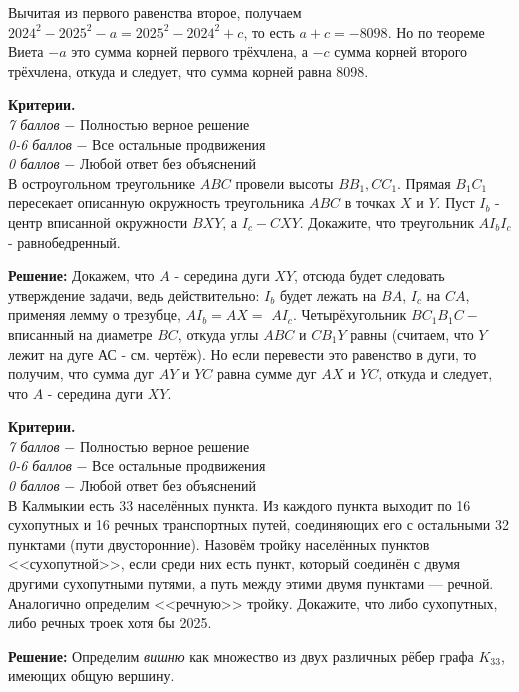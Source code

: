 Вычитая из первого равенства второе, получаем $2024^2-2025^2-a=2025^2-2024^2+c$, то есть $a+c=-8098$. Но по теореме Виета $-a$ это сумма корней первого трёхчлена, а $-c$ сумма корней второго трёхчлена, откуда и следует, что сумма корней равна 8098.

\textbf{Критерии.} \\
\textit{7 баллов} $-$ Полностью верное решение\\
\textit{0-6 баллов} $-$ Все остальные продвижения\\
\textit{0 баллов} $-$ Любой ответ без объяснений\\

В остроугольном треугольнике $A B C$ провели высоты $B B_1, C C_1$. Прямая $B_1 C_1$ пересекает описанную окружность треугольника $A B C$ в точках $X$ и $Y$. Пуст $I_b$ - центр вписанной окружности $BXY$, а $I_c-C X Y$. Докажите, что треугольник $A I_b I_c$ - равнобедренный.

\textbf{Решение:} Докажем, что $A$ - середина дуги $X Y$, отсюда будет следовать утверждение задачи, ведь действительно: $I_b$ будет лежать на $B A$, $I_c$ на $C A$, применяя лемму о трезубце, $A I_b=A X=$ $A I_c$. Четырёхугольник $B C_1 B_1 C-$ вписанный на диаметре $B C$, откуда углы $A B C$ и $C B_1 Y$ равны (считаем, что $Y$ лежит на дуге АС - см. чертёж). Но если перевести это равенство в дуги, то получим, что сумма дуг $A Y$ и $Y C$ равна сумме дуг $A X$ и $Y C$, откуда и следует, что $A$ - середина дуги $X Y$.

\textbf{Критерии.} \\
\textit{7 баллов} $-$ Полностью верное решение\\
\textit{0-6 баллов} $-$ Все остальные продвижения\\
\textit{0 баллов} $-$ Любой ответ без объяснений\\

В Калмыкии есть 33 населённых пункта. Из каждого пункта выходит по 16 сухопутных и 16 речных транспортных путей, соединяющих его с остальными 32 пунктами (пути двусторонние). Назовём тройку населённых пунктов <<сухопутной>>, если среди них есть пункт, который соединён с двумя другими сухопутными путями, а путь между этими двумя пунктами — речной. Аналогично определим <<речную>> тройку. Докажите, что либо сухопутных, либо речных троек хотя бы 2025.

\textbf{Решение:} Определим \textit{вишню} как множество из двух различных рёбер графа $K_{33}$, имеющих общую вершину.

